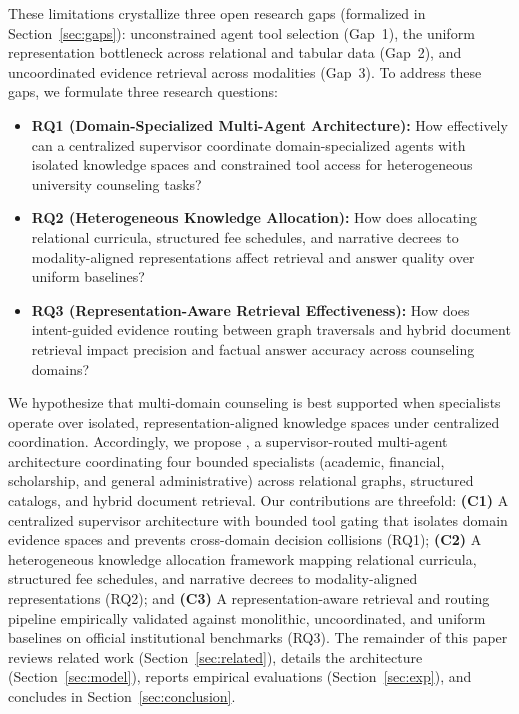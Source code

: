 These limitations crystallize three open research gaps (formalized in Section~\ref{sec:gaps}): unconstrained agent tool selection (Gap~1), the uniform representation bottleneck across relational and tabular data (Gap~2), and uncoordinated evidence retrieval across modalities (Gap~3). To address these gaps, we formulate three research questions:
\begin{itemize}
    \setlength{\itemsep}{0.5pt}
    \setlength{\parsep}{0pt}
    \setlength{\parskip}{0pt}
    \setlength{\topsep}{1pt}

    \item \textbf{RQ1 (Domain-Specialized Multi-Agent Architecture):}
    How effectively can a centralized supervisor coordinate domain-specialized agents with isolated knowledge spaces and constrained tool access for heterogeneous university counseling tasks?

    \item \textbf{RQ2 (Heterogeneous Knowledge Allocation):}
    How does allocating relational curricula, structured fee schedules, and narrative decrees to modality-aligned representations affect retrieval and answer quality over uniform baselines?

    \item \textbf{RQ3 (Representation-Aware Retrieval Effectiveness):}
    How does intent-guided evidence routing between graph traversals and hybrid document retrieval impact precision and factual answer accuracy across counseling domains?
\end{itemize}

We hypothesize that multi-domain counseling is best supported when specialists operate over isolated, representation-aligned knowledge spaces under centralized coordination. Accordingly, we propose \system{}, a supervisor-routed multi-agent architecture coordinating four bounded specialists (academic, financial, scholarship, and general administrative) across relational graphs, structured catalogs, and hybrid document retrieval. Our contributions are threefold: \textbf{(C1)} A centralized supervisor architecture with bounded tool gating that isolates domain evidence spaces and prevents cross-domain decision collisions (RQ1); \textbf{(C2)} A heterogeneous knowledge allocation framework mapping relational curricula, structured fee schedules, and narrative decrees to modality-aligned representations (RQ2); and \textbf{(C3)} A representation-aware retrieval and routing pipeline empirically validated against monolithic, uncoordinated, and uniform baselines on official institutional benchmarks (RQ3). The remainder of this paper reviews related work (Section~\ref{sec:related}), details the \system{} architecture (Section~\ref{sec:model}), reports empirical evaluations (Section~\ref{sec:exp}), and concludes in Section~\ref{sec:conclusion}.
